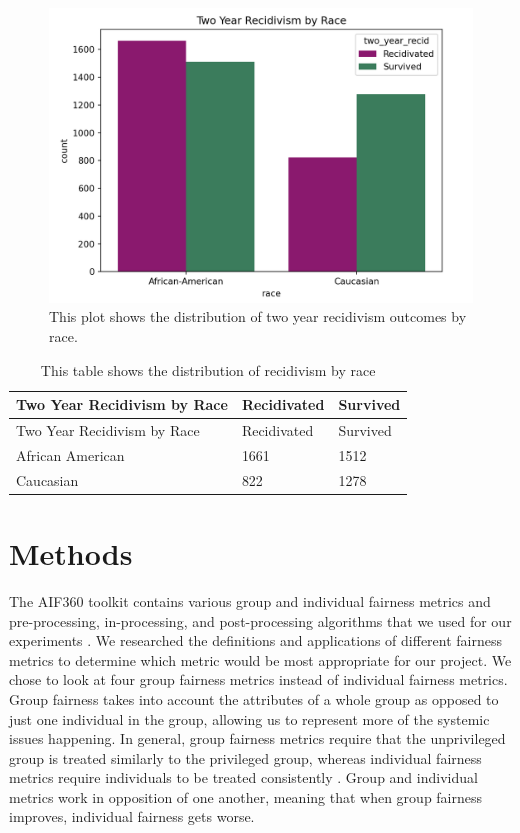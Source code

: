 \documentclass[water,article,submit,moreauthors,pdftex]{mdpi}
\begin{document}
\begin{figure}

{\centering \includegraphics[width=1\linewidth]{../images/race_recid_bar_plot_new} 

}

\caption{This plot shows the distribution of two year recidivism outcomes by race.}\label{fig:recid race plot}
\end{figure}

\begin{longtable}[]{@{}lll@{}}
\caption{This table shows the distribution of recidivism by race
\label{tab:recid table}}\tabularnewline
\toprule
Two Year Recidivism by Race & Recidivated & Survived\tabularnewline
\midrule
\endfirsthead
\toprule
Two Year Recidivism by Race & Recidivated & Survived\tabularnewline
\midrule
\endhead
African American & 1661 & 1512\tabularnewline
Caucasian & 822 & 1278\tabularnewline
\bottomrule
\end{longtable}

\hypertarget{methods}{%
\section{Methods}\label{methods}}

The AIF360 toolkit contains various group and individual fairness
metrics and pre-processing, in-processing, and post-processing
algorithms that we used for our experiments \citep{aif360-oct-2018}. We
researched the definitions and applications of different fairness
metrics \citep{ashokan2021fairness} to determine which metric would be
most appropriate for our project. We chose to look at four group
fairness metrics instead of individual fairness metrics. Group fairness
takes into account the attributes of a whole group as opposed to just
one individual in the group, allowing us to represent more of the
systemic issues happening. In general, group fairness metrics require
that the unprivileged group is treated similarly to the privileged
group, whereas individual fairness metrics require individuals to be
treated consistently \citep{kypraiou_what_2021}. Group and individual
metrics work in opposition of one another, meaning that when group
fairness improves, individual fairness gets worse.
\end{document}
